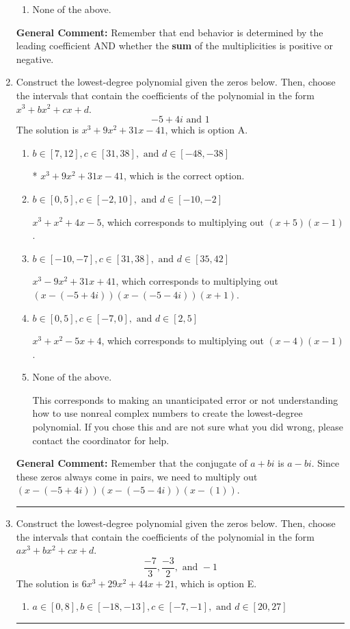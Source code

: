 \documentclass{extbook}[14pt]
\newcommand{\litem}[1]{\item #1

\rule{\textwidth}{0.4pt}}
\begin{document}
\begin{enumerate}
{\begin{enumerate}[label=\Alph*.]
\begin{multicols}{2}
\end{multicols}\item None of the above.\end{enumerate}
\textbf{General Comment:} Remember that end behavior is determined by the leading coefficient AND whether the \textbf{sum} of the multiplicities is positive or negative.
}
\litem{
Construct the lowest-degree polynomial given the zeros below. Then, choose the intervals that contain the coefficients of the polynomial in the form $x^3+bx^2+cx+d$.
\[ -5 + 4 i \text{ and } 1 \]The solution is \( x^{3} +9 x^{2} +31 x -41 \), which is option A.\begin{enumerate}[label=\Alph*.]
\item \( b \in [7, 12], c \in [31, 38], \text{ and } d \in [-48, -38] \)

* $x^{3} +9 x^{2} +31 x -41$, which is the correct option.
\item \( b \in [0, 5], c \in [-2, 10], \text{ and } d \in [-10, -2] \)

$x^{3} + x^{2} +4 x -5$, which corresponds to multiplying out $(x + 5)(x -1)$.
\item \( b \in [-10, -7], c \in [31, 38], \text{ and } d \in [35, 42] \)

$x^{3} -9 x^{2} +31 x + 41$, which corresponds to multiplying out $(x-(-5 + 4 i))(x-(-5 - 4 i))(x + 1)$.
\item \( b \in [0, 5], c \in [-7, 0], \text{ and } d \in [2, 5] \)

$x^{3} + x^{2} -5 x + 4$, which corresponds to multiplying out $(x -4)(x -1)$.
\item \( \text{None of the above.} \)

This corresponds to making an unanticipated error or not understanding how to use nonreal complex numbers to create the lowest-degree polynomial. If you chose this and are not sure what you did wrong, please contact the coordinator for help.
\end{enumerate}

\textbf{General Comment:} Remember that the conjugate of $a+bi$ is $a-bi$. Since these zeros always come in pairs, we need to multiply out $(x-(-5 + 4 i))(x-(-5 - 4 i))(x-(1))$.
}
\litem{
Construct the lowest-degree polynomial given the zeros below. Then, choose the intervals that contain the coefficients of the polynomial in the form $ax^3+bx^2+cx+d$.
\[ \frac{-7}{3}, \frac{-3}{2}, \text{ and } -1 \]The solution is \( 6x^{3} +29 x^{2} +44 x + 21 \), which is option E.\begin{enumerate}[label=\Alph*.]
\item \( a \in [0, 8], b \in [-18, -13], c \in [-7, -1], \text{ and } d \in [20, 27] \)


\end{enumerate}}
\end{enumerate}
\end{document}
